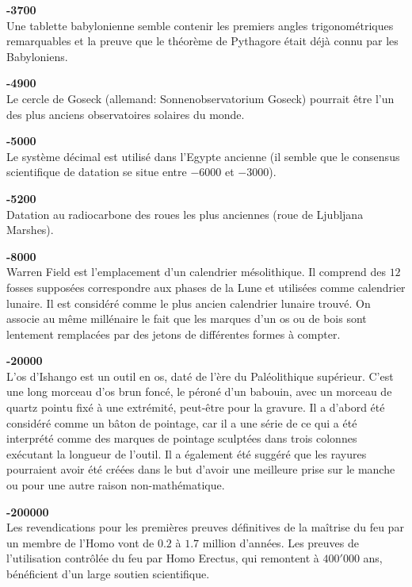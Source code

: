 \textbf{-3700}\\
Une tablette babylonienne semble contenir les premiers angles trigonométriques remarquables et la preuve que le théorème de Pythagore était déjà connu par les Babyloniens.

\textbf{-4900}\\
Le cercle de Goseck (allemand: Sonnenobservatorium Goseck) pourrait être l'un des plus anciens observatoires solaires du monde.

\textbf{-5000}\\
Le système décimal est utilisé dans l'Egypte ancienne (il semble que le consensus scientifique de datation se situe entre $-6000$ et $-3000$).

\textbf{-5200}\\
Datation au radiocarbone des roues les plus anciennes (roue de Ljubljana Marshes).

\textbf{-8000}\\
Warren Field est l'emplacement d'un calendrier mésolithique. Il comprend des $12$ fosses supposées correspondre aux phases de la Lune et utilisées comme calendrier lunaire. Il est considéré comme le plus ancien calendrier lunaire trouvé. On associe au même  millénaire le fait que les marques d'un os ou de bois sont lentement remplacées par des jetons de différentes formes à compter.

\textbf{-20000}\\
L'os d'Ishango est un outil en os, daté de l'ère du Paléolithique supérieur. C'est une long morceau d'os brun foncé, le péroné d'un babouin, avec un morceau de quartz pointu fixé à une extrémité, peut-être pour la gravure. Il a d'abord été considéré comme un bâton de pointage, car il a une série de ce qui a été interprété comme des marques de pointage sculptées dans trois colonnes exécutant la longueur de l'outil. Il a également été suggéré que les rayures pourraient avoir été créées dans le but d'avoir une meilleure prise sur le manche ou pour une autre raison non-mathématique.

\textbf{-200000}\\
Les revendications pour les premières preuves définitives de la maîtrise du feu par un membre de l'Homo vont de $0.2$ à $1.7$ million d'années. Les preuves de l'utilisation contrôlée du feu par Homo Erectus, qui remontent à $400'000$ ans, bénéficient d'un large soutien scientifique.